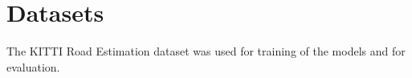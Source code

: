 
\section{Datasets}\label{sec:datasets}
The KITTI Road Estimation dataset \cite{Fritsch2013} was used for training
of the models and for evaluation.

